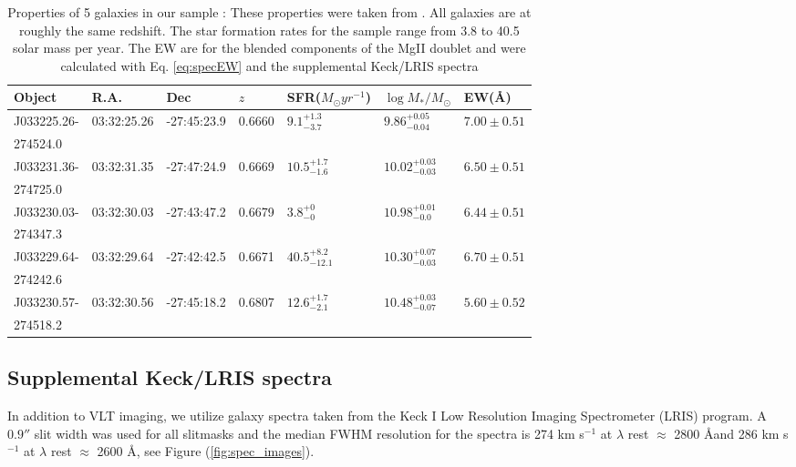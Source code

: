 \documentclass[twocolumn]{aastex6}
\begin{document}
\begin{table}[t]
\centering
\caption{Properties of 5 galaxies in our sample :  These properties were taken from \cite{Rubin_2014}. All galaxies are at roughly the same redshift. The star formation rates for the sample range from 3.8 to 40.5 solar mass per year. The EW are for the blended components of the MgII doublet and were calculated with Eq. \ref{eq:specEW} and the supplemental Keck/LRIS spectra}
\begin{tabular}{lllllll} \hline \hline
Object & R.A. & Dec  & $z$ & SFR($M_{\odot} yr^{-1}$) & $\log{M_{*}/M_{\odot}}$ & EW(\AA) \smallskip      \\ \hline 
J033225.26-      & 03:32:25.26 & -27:45:23.9 & 0.6660 & $9.1_{-3.7}^{+1.3}$& $9.86_{-0.04}^{+0.05}$ & $7.00\pm 0.51$\\ 
274524.0     & &  &  &         \\
J033231.36-      & 03:32:31.35 & -27:47:24.9 &   0.6669 & $10.5_{-1.6}^{+1.7}$ & $10.02_{-0.03}^{+0.03}$&$6.50 \pm 0.51$\\
274725.0      & &  &   &        \\
J033230.03-      & 03:32:30.03 & -27:43:47.2  &   0.6679 & $3.8_{-0}^{+0}$ & $10.98_{-0.0}^{+0.01}$ &$6.44 \pm 0.51$\\
274347.3      & &  &   &        \\
J033229.64-      & 03:32:29.64 & -27:42:42.5 & 0.6671 & $40.5_{-12.1}^{+8.2}$ & $10.30_{-0.03}^{+0.07}$ &$6.70 \pm 0.51$\\
274242.6     & &  &     &      \\
J033230.57-      & 03:32:30.56 & -27:45:18.2 &   0.6807  & $12.6_{-2.1}^{+1.7}$ & $10.48_{-0.07}^{+0.03}$ &$5.60 \pm 0.52$ \\
274518.2      & &  &  &         \\ \hline 
\end{tabular}

\label{tab:prop}
\end{table}

\subsection{Supplemental Keck/LRIS spectra}
In addition to VLT imaging, we utilize galaxy spectra taken from the \cite{Rubin_2014} Keck I Low Resolution Imaging Spectrometer (LRIS) program. A $0.9''$ slit width was used for all slitmasks and the median FWHM resolution for the spectra is 274 km s$^{-1}$ at $\lambda$ rest $\approx$ 2800 \AA and 286 km s$^{-1}$  at $\lambda$ rest $\approx$ 2600 \AA, see Figure (\ref{fig:spec_images}).
\end{document}
